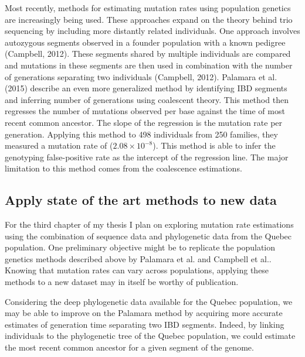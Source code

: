 \documentclass[
11pt, %
oneside, %
english, %
doublespacing, %
headsepline, %
]{MastersDoctoralThesis} %
\begin{document}
Most recently, methods for estimating mutation rates using population genetics are increasingly being used.
These approaches expand on the theory behind trio sequencing by including more distantly related individuals.
One approach involves autozygous segments observed in a founder population with a known pedigree (Campbell, 2012).
These segments shared by multiple individuals are compared and mutations in these segments are then used in combination with the number of generations separating two individuals (Campbell, 2012).
Palamara et al. (2015) describe an even more generalized method by identifying IBD segments and inferring number of generations using coalescent theory.
This method then regresses the number of mutations observed per base against the time of most recent common ancestor.
The slope of the regression is the mutation rate per generation.
Applying this method to 498 individuals from 250 families, they measured a mutation rate of ($2.08\times10^{-8}$).
This method is able to infer the genotyping false-positive rate as the intercept of the regression line.
The major limitation to this method comes from the coalescence estimations.

\subsection{Apply state of the art methods to new data}
For the third chapter of my thesis I plan on exploring mutation rate estimations using the combination of sequence data and phylogenetic data from the Quebec population.
One preliminary objective might be to replicate the population genetics methods described above by Palamara et al. and Campbell et al..
Knowing that mutation rates can vary across populations, applying these methods to a new dataset may in itself be worthy of publication.

Considering the deep phylogenetic data available for the Quebec population, we may be able to improve on the Palamara method by acquiring more accurate estimates of generation time separating two IBD segments.
Indeed, by linking individuals to the phylogenetic tree of the Quebec population, we could estimate the most recent common ancestor for a given segment of the genome. 



\end{document}
